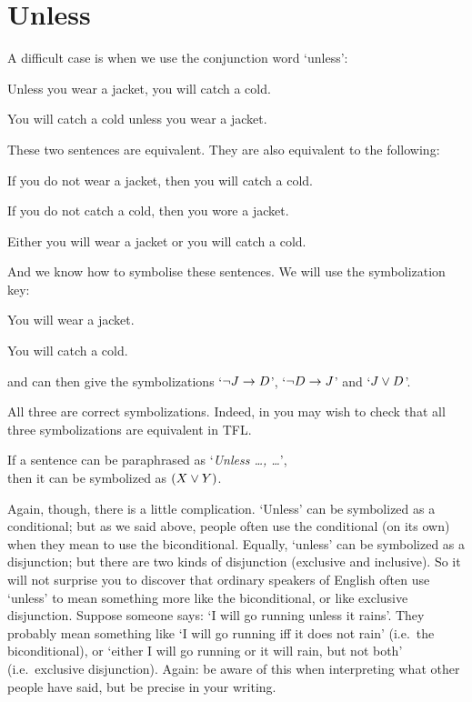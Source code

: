 \section{Unless}
A difficult case is when we use the conjunction word `unless':

\begin{samplesent}
\item\label{sent:unless1} Unless you wear a jacket, you will catch a cold.
\item\label{sent:unless2} You will catch a cold unless you wear a jacket.
\end{samplesent}
These two sentences are equivalent. They are also equivalent to the following:
\begin{samplesent}
\item\label{sent:unless3}  If you do not wear a jacket, then you will catch a cold.
\item\label{sent:unless4}  If you do not catch a cold, then you wore a jacket.
\item\label{sent:unless5} Either you will wear a jacket or you will catch a cold.
\end{samplesent}
And we know how to symbolise these sentences. We will use the symbolization key:
	\begin{ekey}
		\item[J] You will wear a jacket.
		\item[D] You will catch a cold.
	\end{ekey} and can then give the symbolizations `$\neg J \rightarrow D$', `$\neg D \rightarrow J$' and `$J \vee D$'.

All three are correct symbolizations. Indeed, in you may wish to check that all three symbolizations are equivalent in TFL.
	\begin{highlighted}
		If a sentence can be paraphrased as `\emph{Unless \ldots, \ldots}', \\then it can be symbolized as $(X\vee Y)$.
	\end{highlighted}
Again, though, there is a little complication. `Unless' can be symbolized as a conditional; but as we said above, people often use the conditional (on its own) when they mean to use the biconditional. Equally, `unless' can be symbolized as a disjunction; but there are two kinds of disjunction (exclusive and inclusive). So it will not surprise you to discover that ordinary speakers of English often use `unless' to mean something more like the biconditional, or like exclusive disjunction. Suppose someone says: `I will go running unless it rains'. They probably mean something like `I will go running iff it does not rain' (i.e.\ the biconditional), or  `either I will go running or it will rain, but not both' (i.e.\ exclusive disjunction). Again: be aware of this when interpreting what other people have said, but be precise in your writing.


